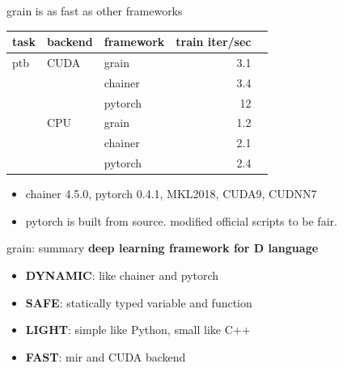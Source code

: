 \documentclass[aspectratio=169,
  14pt,xcolor=dvipsnames,table,professional font,dvipdfmx]{beamer}
\begin{document}
\begin{frame}{grain is as \alert{fast} as other frameworks}
    \begin{table}
	\begin{tabular}{lllrr}
      \toprule
      task & backend  & framework & train iter/sec \\
      \midrule
      ptb   & CUDA & grain      & 3.1  \\
            &      & chainer    & 3.4 \\
            &      & pytorch    & 12 \\
      \midrule
            & CPU  & grain      & 1.2 \\
            &      & chainer    & 2.1 \\
            &      & pytorch    & 2.4 \\
      \bottomrule
	\end{tabular}
    \end{table}
    \begin{itemize}
      \item chainer 4.5.0, pytorch 0.4.1, MKL2018, CUDA9, CUDNN7
      \item pytorch is built from source. modified official scripts to be fair.
    \end{itemize}
\end{frame}


\begin{frame}{grain: summary} %
  \large
  \textbf{deep learning framework for \alert{D language}}
  \vspace{1em}
  \begin{itemize}
    \large
  \item \textbf{DYNAMIC}: like chainer and pytorch
  \item \textbf{SAFE}: statically typed variable and function
  \item \textbf{LIGHT}: simple like Python, small like C++
  \item \textbf{FAST}: mir and CUDA backend
  \end{itemize}
\end{frame}
\end{document}

